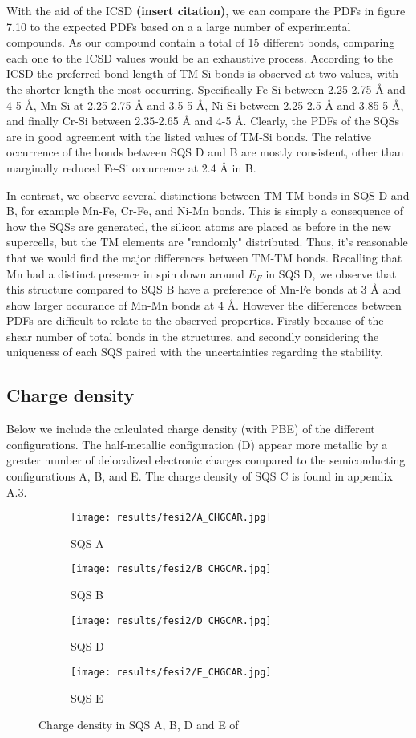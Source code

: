 With the aid of the ICSD \textbf{(insert citation)}, we can compare the PDFs in figure 7.10 to the expected PDFs based on a a large number of experimental compounds. As our compound contain a total of 15 different bonds, comparing each one to the ICSD values would be an exhaustive process. According to the ICSD   the preferred bond-length of TM-Si bonds is observed at two values, with the shorter length the most occurring. Specifically Fe-Si between 2.25-2.75 Å and 4-5 Å, Mn-Si at 2.25-2.75 Å and 3.5-5 Å, Ni-Si between 2.25-2.5 Å and 3.85-5 Å, and finally Cr-Si between 2.35-2.65 Å and 4-5 Å. Clearly, the PDFs of the SQSs are in good agreement with the listed values of TM-Si bonds. The relative occurrence of the bonds between SQS D and B are mostly consistent, other than marginally reduced Fe-Si occurrence at 2.4 Å in B.

In contrast, we observe several distinctions between TM-TM bonds in SQS D and B, for example Mn-Fe, Cr-Fe, and Ni-Mn bonds. This is simply a consequence of how the SQSs are generated, the silicon atoms are placed as before in the new supercells, but the TM elements are "randomly" distributed. Thus, it's reasonable that we would find the major differences between TM-TM bonds. Recalling that Mn had a distinct presence in spin down around $E_F$ in SQS D, we observe that this structure compared to SQS B have a preference of Mn-Fe bonds at 3 Å and show larger occurance of Mn-Mn bonds at 4 Å. However the differences between PDFs are difficult to relate to the observed properties. Firstly because of the shear number of total bonds in the structures, and secondly considering the uniqueness of each SQS paired with the uncertainties regarding the stability.

\subsection{Charge density}
Below we include the calculated charge density (with PBE) of the different configurations. The half-metallic configuration (D) appear more metallic by a greater number of delocalized electronic charges compared to the semiconducting configurations A, B, and E. The charge density of SQS C is found in appendix A.3. 

\begin{figure}[H]
\begin{subfigure}{.5\textwidth}
\texttt{[image: results/fesi2/A\_CHGCAR.jpg]}
\caption{SQS A}
\end{subfigure}
\begin{subfigure}{.5\textwidth}
\texttt{[image: results/fesi2/B\_CHGCAR.jpg]}
\caption{SQS B}
\end{subfigure}
\begin{subfigure}{.5\textwidth}
\texttt{[image: results/fesi2/D\_CHGCAR.jpg]}
\caption{SQS D}
\end{subfigure}
\begin{subfigure}{.5\textwidth}
\texttt{[image: results/fesi2/E\_CHGCAR.jpg]}
\caption{SQS E}
\end{subfigure}
\caption{Charge density in SQS A, B, D and E of }
\end{figure}


